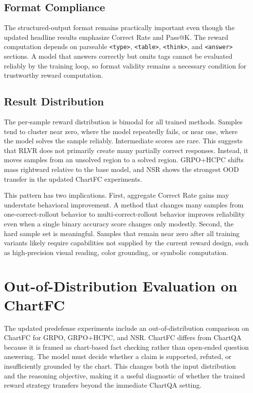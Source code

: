 \documentclass{iutbscthesis}
\begin{document}
\subsection{Format Compliance}

The structured-output format remains practically important even though the updated headline results emphasize Correct Rate and Pass@K. The reward computation depends on parseable \texttt{<type>}, \texttt{<table>}, \texttt{<think>}, and \texttt{<answer>} sections. A model that answers correctly but omits tags cannot be evaluated reliably by the training loop, so format validity remains a necessary condition for trustworthy reward computation.

\subsection{Result Distribution}

The per-sample reward distribution is bimodal for all trained methods. Samples tend to cluster near zero, where the model repeatedly fails, or near one, where the model solves the sample reliably. Intermediate scores are rare. This suggests that RLVR does not primarily create many partially correct responses. Instead, it moves samples from an unsolved region to a solved region. GRPO+HCPC shifts mass rightward relative to the base model, and NSR shows the strongest OOD transfer in the updated ChartFC experiments.

This pattern has two implications. First, aggregate Correct Rate gains may understate behavioral improvement. A method that changes many samples from one-correct-rollout behavior to multi-correct-rollout behavior improves reliability even when a single binary accuracy score changes only modestly. Second, the hard sample set is meaningful. Samples that remain near zero after all training variants likely require capabilities not supplied by the current reward design, such as high-precision visual reading, color grounding, or symbolic computation.

\section{Out-of-Distribution Evaluation on ChartFC}

The updated predefense experiments include an out-of-distribution comparison on ChartFC for GRPO, GRPO+HCPC, and NSR. ChartFC differs from ChartQA because it is framed as chart-based fact checking rather than open-ended question answering. The model must decide whether a claim is supported, refuted, or insufficiently grounded by the chart. This changes both the input distribution and the reasoning objective, making it a useful diagnostic of whether the trained reward strategy transfers beyond the immediate ChartQA setting.
\end{document}
